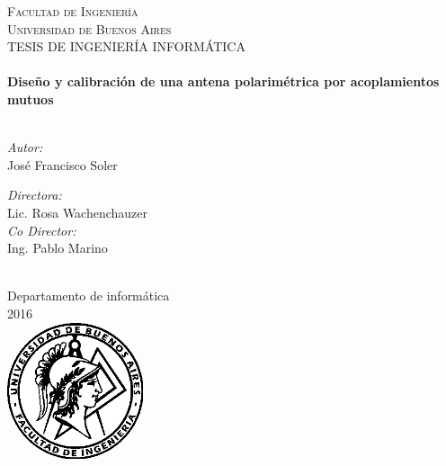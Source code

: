 \documentclass[11pt, oneside]{Thesis} %
\begin{document}
\begin{titlepage}
\begin{center}

\textsc{\LARGE Facultad de Ingeniería \\ Universidad de Buenos Aires}\\[1.5cm] %
\textsc{\Large TESIS DE INGENIERÍA INFORMÁTICA}\\[0.5cm] %

\HRule \\[0.4cm] %
{\huge \bfseries Diseño y calibración de una antena polarimétrica por acoplamientos mutuos}\\[0.4cm] %
\HRule \\[1.5cm] %

\begin{minipage}{0.4\textwidth}
\begin{flushleft} \large
\emph{Autor:}\\
{José Francisco Soler} %
\end{flushleft}
\end{minipage}
\begin{minipage}{0.4\textwidth}
\begin{flushright} \large
\emph{Directora:} \\
{Lic. Rosa Wachenchauzer} \\
\emph{Co Director:} \\
{Ing. Pablo Marino} %
\end{flushright}
\end{minipage}\\[3cm]

Departamento de informática\\
2016\\[2cm] %

\includegraphics[width=4cm]{Logo2.png} %

\vfill
\end{center}

\end{titlepage}
\end{document}
